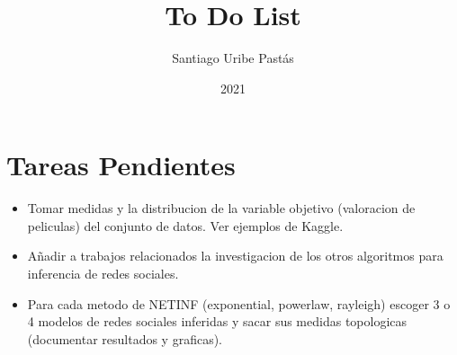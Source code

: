\documentclass{article}
\title{To Do List}
\author{Santiago Uribe Pastás}
\date{2021}
\begin{document}
\maketitle

\section{Tareas Pendientes}
\begin{itemize}
    \item Tomar medidas y la distribucion de la variable objetivo (valoracion de peliculas) del conjunto de datos. Ver ejemplos de Kaggle.
    \item Añadir a trabajos relacionados la investigacion de los otros algoritmos para inferencia de redes sociales.
    \item Para cada metodo de NETINF (exponential, powerlaw, rayleigh) escoger 3 o 4 modelos de redes sociales inferidas y sacar sus medidas topologicas (documentar resultados y graficas).
\end{itemize}
\end{document}
